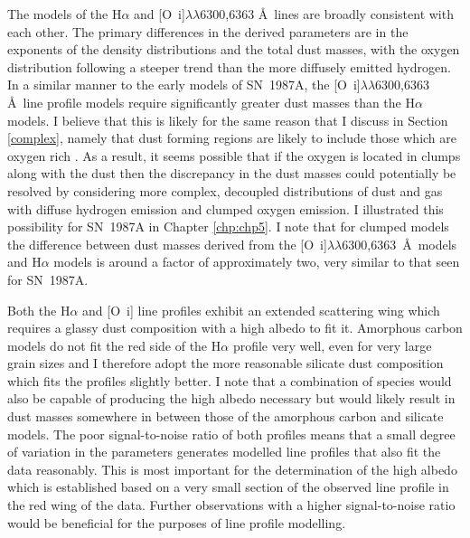 
The models of the H$\alpha$ and [O~{\sc i}]$\lambda\lambda$6300,6363 \AA\ lines are broadly consistent with each other.  The primary differences in the derived parameters are in the exponents of the density distributions and the total dust masses, with the oxygen distribution following a steeper trend than the more diffusely emitted hydrogen.  In a similar manner to the early models of SN~1987A, the [O~{\sc i}]$\lambda\lambda$6300,6363 \AA\ line profile models require significantly greater dust masses than the H$\alpha$ models. I believe that this is likely for the same reason that I discuss in Section \ref{complex}, namely that dust forming regions are likely to include those which are oxygen rich \citep{Kozma1998a}.  As a result, it seems possible that if the oxygen is  located in clumps along with the dust then the discrepancy in the dust masses could potentially be resolved by considering more complex, decoupled distributions of dust and gas with diffuse hydrogen emission and clumped oxygen emission.  I illustrated this possibility for SN~1987A in Chapter \ref{chp:chp5}.  I note that for clumped models the difference between dust masses derived from the [O~{\sc i}]$\lambda\lambda$6300,6363~\AA\ models and H$\alpha$ models is around a factor of approximately two, very similar to that seen for SN~1987A.  

Both the H$\alpha$ and [O~{\sc i}] line profiles exhibit an extended scattering wing which requires a glassy dust composition with a high albedo to fit it.  Amorphous carbon models do not fit the red side of the H$\alpha$ profile very well, even for very large grain sizes and I therefore adopt the more reasonable silicate dust composition which fits the profiles slightly better.  I note that a combination of species would also be capable of producing the high albedo necessary but would likely result in dust masses somewhere in between those of the amorphous carbon and silicate models.  The poor signal-to-noise ratio of both profiles means that a small degree of variation in the parameters generates modelled line profiles that also fit the data reasonably.  This is most important for the determination of the high albedo which is established based on a very small section of the observed line profile in the red wing of the data.  Further observations with a higher signal-to-noise ratio would be beneficial for the purposes of line profile modelling. 

